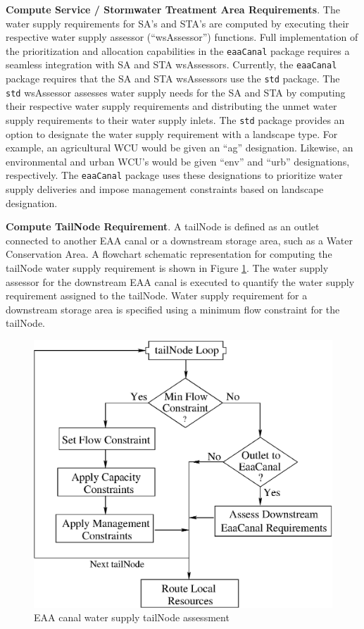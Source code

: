 {\bf Compute Service / Stormwater Treatment Area Requirements}. The
water supply requirements for SA's and STA's are computed by executing
their respective water supply assessor (``wsAssessor'') functions.
Full implementation of the prioritization and allocation capabilities
in the {\tt eaaCanal} package requires a seamless integration with SA
and STA wsAssessors.  Currently, the {\tt eaaCanal} package requires
that the SA and STA wsAssessors use the {\tt std} package.  The {\tt
std} wsAssessor assesses water supply needs for the SA and STA by
computing their respective water supply requirements and distributing
the unmet water supply requirements to their water supply inlets.  The
{\tt std} package provides an option to designate the water supply
requirement with a landscape type.  For example, an agricultural WCU
would be given an ``ag'' designation.  Likewise, an environmental and
urban WCU's would be given ``env'' and ``urb'' designations,
respectively.  The {\tt eaaCanal} package uses these designations to
prioritize water supply deliveries and impose management constraints
based on landscape designation.

{\bf Compute TailNode Requirement}. A tailNode is defined as an outlet
connected to another EAA canal or a downstream storage area, such as a
Water Conservation Area.  A flowchart schematic representation for
computing the tailNode water supply requirement is shown in
Figure \ref{fig:eaaCanalWSTailNodes}.  The water supply assessor for
the downstream EAA canal is executed to quantify the water supply
requirement assigned to the tailNode.  Water supply requirement for a
downstream storage area is specified using a minimum flow constraint
for the tailNode.

\begin{figure}[!htb]
 \begin{center}
  \includegraphics[scale=.5]{Graphics/eaaCanalWSTailNodes}
  \caption{\label{fig:eaaCanalWSTailNodes} EAA canal water supply tailNode assessment}
 \end{center}
\end{figure}

